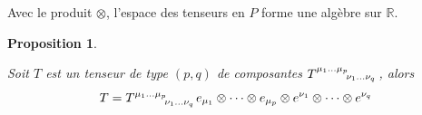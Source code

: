 \documentclass[a4paper,11pt]{report}
\theoremstyle{definition}
\theoremstyle{plain}
\newtheorem{prop}[thm]{Proposition}
\theoremstyle{definition}
\theoremstyle{remark}
\begin{document}
                Avec le produit $\otimes$, l'espace des tenseurs en $P$ forme une algèbre sur $\mathbb{R}$.
                
                \begin{prop}\begin{leftbar}
                    Soit $T$ est un tenseur de type $(p,q)$ de composantes $T\indices{^{\mu_1\dots\mu_p}_{\nu_1\dots\nu_q}}$, alors
                    \begin{equation}
                        T = T\indices{^{\mu_1\dots\mu_p}_{\nu_1\dots\nu_q}} e_{\mu_1}\otimes\dots\otimes e_{\mu_p}\otimes e^{\nu_1}\otimes\dots\otimes e^{\nu_q}
                    \end{equation}
                \end{leftbar}\end{prop}
                
\end{document}
